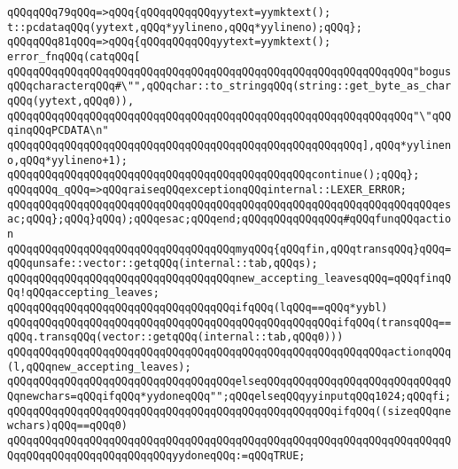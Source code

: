 \verb|qQQqqQQq79qQQq=>qQQq{qQQqqQQqqQQqyytext=yymktext();|\newline
\verb|t::pcdataqQQq(yytext,qQQq*yylineno,qQQq*yylineno);qQQq};|\newline
\verb|qQQqqQQq81qQQq=>qQQq{qQQqqQQqqQQqyytext=yymktext();|\newline
\verb|error_fnqQQq(catqQQq[|\newline
\verb|qQQqqQQqqQQqqQQqqQQqqQQqqQQqqQQqqQQqqQQqqQQqqQQqqQQqqQQqqQQqqQQq"bogusqQQqcharacterqQQq#\"",qQQqchar::to_stringqQQq(string::get_byte_as_charqQQq(yytext,qQQq0)),|\newline
\verb|qQQqqQQqqQQqqQQqqQQqqQQqqQQqqQQqqQQqqQQqqQQqqQQqqQQqqQQqqQQqqQQq"\"qQQqinqQQqPCDATA\n"|\newline
\verb|qQQqqQQqqQQqqQQqqQQqqQQqqQQqqQQqqQQqqQQqqQQqqQQqqQQqqQQq],qQQq*yylineno,qQQq*yylineno+1);|\newline
\verb|qQQqqQQqqQQqqQQqqQQqqQQqqQQqqQQqqQQqqQQqqQQqqQQqcontinue();qQQq};|\newline
\verb|qQQqqQQq_qQQq=>qQQqraiseqQQqexceptionqQQqinternal::LEXER_ERROR;|\newline
\newline
\verb|qQQqqQQqqQQqqQQqqQQqqQQqqQQqqQQqqQQqqQQqqQQqqQQqqQQqqQQqqQQqqQQqqQQqesac;qQQq};qQQq}qQQq);qQQqesac;qQQqend;qQQqqQQqqQQqqQQq#qQQqfunqQQqaction|\newline
\newline
\verb|qQQqqQQqqQQqqQQqqQQqqQQqqQQqqQQqqQQqmyqQQq{qQQqfin,qQQqtransqQQq}qQQq=qQQqunsafe::vector::getqQQq(internal::tab,qQQqs);|\newline
\verb|qQQqqQQqqQQqqQQqqQQqqQQqqQQqqQQqqQQqnew_accepting_leavesqQQq=qQQqfinqQQq!qQQqaccepting_leaves;|\newline
\verb|qQQqqQQqqQQqqQQqqQQqqQQqqQQqqQQqqQQqifqQQq(lqQQq==qQQq*yybl)|\newline
\verb|qQQqqQQqqQQqqQQqqQQqqQQqqQQqqQQqqQQqqQQqqQQqqQQqqQQqifqQQq(transqQQq==qQQq.transqQQq(vector::getqQQq(internal::tab,qQQq0)))|\newline
\verb|qQQqqQQqqQQqqQQqqQQqqQQqqQQqqQQqqQQqqQQqqQQqqQQqqQQqqQQqqQQqactionqQQq(l,qQQqnew_accepting_leaves);|\newline
\verb|qQQqqQQqqQQqqQQqqQQqqQQqqQQqqQQqqQQqelseqQQqqQQqqQQqqQQqqQQqqQQqqQQqqQQqnewchars=qQQqifqQQq*yydoneqQQq"";qQQqelseqQQqyyinputqQQq1024;qQQqfi;|\newline
\verb|qQQqqQQqqQQqqQQqqQQqqQQqqQQqqQQqqQQqqQQqqQQqqQQqqQQqifqQQq((sizeqQQqnewchars)qQQq==qQQq0)|\newline
\verb|qQQqqQQqqQQqqQQqqQQqqQQqqQQqqQQqqQQqqQQqqQQqqQQqqQQqqQQqqQQqqQQqqQQqqQQqqQQqqQQqqQQqqQQqqQQqqQQqyydoneqQQq:=qQQqTRUE;|\newline
